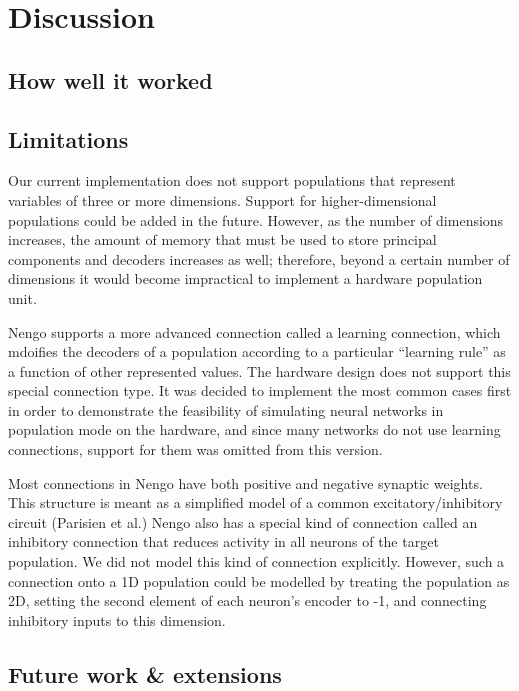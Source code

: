 \documentclass[english]{article}
\begin{document}
\section{Discussion}

\subsection{How well it worked}

\subsection{Limitations}

Our current implementation does not support populations that represent variables of three or more dimensions.
Support for higher-dimensional populations could be added in the future.
However, as the number of dimensions increases, the
amount of memory that must be used to store principal components and
decoders increases as well; therefore, beyond a certain number of
dimensions it would become impractical to implement a hardware
population unit.  

Nengo supports a more advanced connection called a learning connection,
which mdoifies the decoders of a population according to a particular ``learning rule''
as a function of other represented values. The hardware design does not support this special connection type.
It was decided to implement the most common cases first in order to demonstrate the feasibility of simulating
neural networks in population mode on the hardware, and since many networks do not use learning connections,
support for them was omitted from this version.

Most connections in Nengo have both positive and negative synaptic weights. This
structure is meant as a simplified model of a common excitatory/inhibitory circuit
(Parisien et al.) %
Nengo also has a special kind of connection called an inhibitory connection that
reduces activity in all neurons of the target population. We did not model this kind of connection explicitly.
However, such a connection onto a 1D population could be modelled by treating the population as 2D,
setting the second element of each neuron's encoder to -1, and connecting inhibitory inputs to this dimension.


\subsection{Future work \& extensions}
\end{document}
